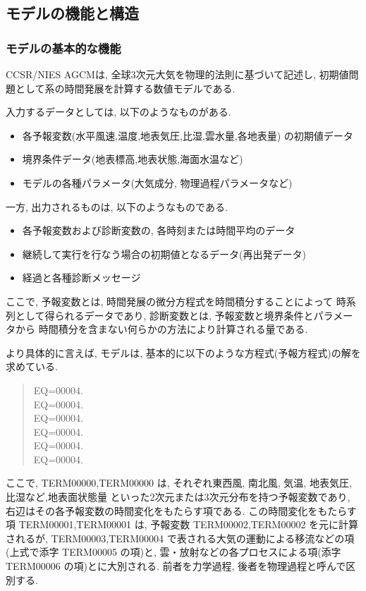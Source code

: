 ﻿%

\subsection{モデルの機能と構造}
\subsubsection{モデルの基本的な機能}

CCSR/NIES AGCMは, 全球3次元大気を物理的法則に基づいて記述し, 
初期値問題として系の時間発展を計算する数値モデルである.

入力するデータとしては, 以下のようなものがある.
\begin{itemize}
\item 各予報変数(水平風速,温度,地表気圧,比湿,雲水量,各地表量) の初期値データ
\item 境界条件データ(地表標高,地表状態,海面水温など)
\item モデルの各種パラメータ(大気成分, 物理過程パラメータなど)
\end{itemize}
%
一方, 出力されるものは, 以下のようなものである.
\begin{itemize}
\item 各予報変数および診断変数の, 各時刻または時間平均のデータ
\item 継続して実行を行なう場合の初期値となるデータ(再出発データ)
\item 経過と各種診断メッセージ
\end{itemize}
%
ここで, 予報変数とは, 時間発展の微分方程式を時間積分することによって
時系列として得られるデータであり,
診断変数とは, 予報変数と境界条件とパラメータから
時間積分を含まない何らかの方法により計算される量である.

より具体的に言えば,
モデルは, 基本的に以下のような方程式(予報方程式)の解を求めている.

\begin{quote}
\label{struct:u-eq-1}
EQ=00004.\\
EQ=00004.\\
EQ=00004.\\
EQ=00004.\\
EQ=00004.\\
EQ=00004.
\end{quote}

ここで, TERM00000,TERM00000 は, 
それぞれ東西風, 南北風, 気温, 地表気圧,比湿など,地表面状態量
といった2次元または3次元分布を持つ予報変数であり,
右辺はその各予報変数の時間変化をもたらす項である.
この時間変化をもたらす項 TERM00001,TERM00001 は,  
予報変数 TERM00002,TERM00002 を元に計算されるが,
TERM00003,TERM00004 で表される大気の運動による移流などの項(上式で添字 TERM00005 の項)と,
雲・放射などの各プロセスによる項(添字 TERM00006 の項)とに大別される.
前者を力学過程, 後者を物理過程と呼んで区別する.

